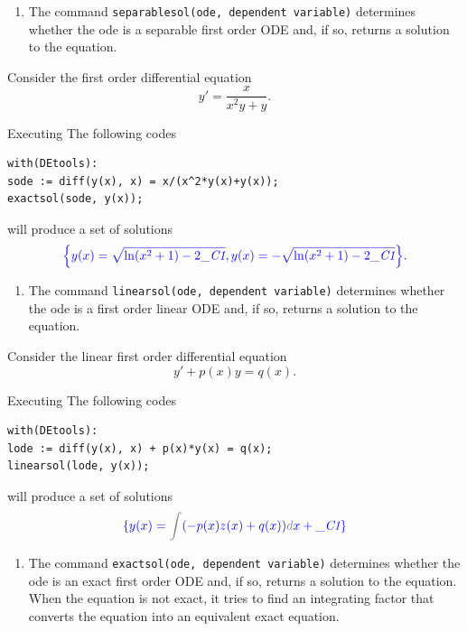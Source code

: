 \documentclass[
  12pt]{elegantbook}
\providecommand{\tightlist}{%
  \setlength{\itemsep}{0pt}\setlength{\parskip}{0pt}}
\begin{document}
\begin{enumerate}
\def\labelenumi{\arabic{enumi}.}
\tightlist
\item
  The command \texttt{separablesol(ode,\ dependent\ variable)} determines whether the ode is a separable first order ODE and, if so, returns a solution to the equation.
\end{enumerate}

\begin{example}
Consider the first order differential equation
\[y'=\frac{x}{x^2y+y}.\]

Executing The following codes

\begin{verbatim}
with(DEtools):
sode := diff(y(x), x) = x/(x^2*y(x)+y(x));
exactsol(sode, y(x));
\end{verbatim}

will produce a set of solutions
\[\color{blue}{\left\{y(x) = \sqrt{\ln(x^{2}+1)-2\_\textit{C1}}, y(x) = -\sqrt{\ln(x^{2}+1)-2\_\textit{C1}}\right\}}.\]
\end{example}

\begin{enumerate}
\def\labelenumi{\arabic{enumi}.}
\setcounter{enumi}{1}
\tightlist
\item
  The command \texttt{linearsol(ode,\ dependent\ variable)} determines whether the ode is a first order linear ODE and, if so, returns a solution to the equation.
\end{enumerate}

\begin{example}
Consider the linear first order differential equation
\[y'+p(x)y=q(x).\]

Executing The following codes

\begin{verbatim}
with(DEtools):
lode := diff(y(x), x) + p(x)*y(x) = q(x);
linearsol(lode, y(x));
\end{verbatim}

will produce a set of solutions
\[
\color{blue}{
\{y(x) = {\color{gray}{\int}}(-p(x) z(x)+q(x)){\color{gray}{d}}x +\_\textit{C1}\}
}
\]
\end{example}

\begin{enumerate}
\def\labelenumi{\arabic{enumi}.}
\setcounter{enumi}{2}
\tightlist
\item
  The command \texttt{exactsol(ode,\ dependent\ variable)} determines whether the ode is an exact first order ODE and, if so, returns a solution to the equation. When the equation is not exact, it tries to find an integrating factor that converts the equation into an equivalent exact equation.
\end{enumerate}
\end{document}
